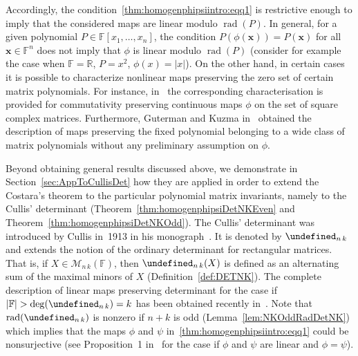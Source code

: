 \documentclass{elsarticle}
\let\det\undefined
\DeclareMathOperator{\det}{det}
\DeclareMathOperator{\rad}{rad}
\def\F{{\mathbb F}}
\def\M{{\mathcal M}}
\theoremstyle{definition}
\numberwithin{equation}{section}
\begin{document}
Accordingly, the condition~\eqref{thm:homogenphipsiintro:eqq1} is restrictive enough to imply that the considered maps are linear modulo $\rad(P)$. In general, for a given polynomial $P \in \F[x_1,\ldots, x_n]$, the condition $P(\phi(\mathbf x)) = P(\mathbf x)$ for all $\mathbf x \in \F^n$ does not imply that $\phi$ is linear modulo $\rad(P)$ (consider for example the case when $\F = \mathbb R$, $P = x^2$, $\phi(x) = |x|$). On the other hand, in certain cases it is possible to characterize nonlinear maps preserving the zero set of certain matrix polynomials. For instance, in~\cite{SEMRL20081051} the corresponding characterisation is provided for commutativity preserving continuous maps $\phi$ on the set of square complex matrices. Furthermore, Guterman and Kuzma in~\cite{Guterman11112009} obtained the description of maps preserving the fixed polynomial belonging to a wide class of matrix polynomials without any preliminary assumption on $\phi$. 


%
%
%

Beyond obtaining general results discussed above, we demonstrate in Section~\ref{sec:AppToCullisDet} how they are applied in order to extend the Costara's theorem to the particular polynomial matrix invariants, namely to the Cullis' determinant (Theorem~\ref{thm:homogenphipsiDetNKEven} and Theorem~\ref{thm:homogenphipsiDetNKOdd}). The Cullis' determinant was introduced by Cullis in~1913 in his monograph~\cite{cullis1913}. It is denoted by $\det_{n\,k}$ and extends the notion of the ordinary determinant for rectangular matrices. That is, if $X \in \M_{n\,k}(\F)$, then $\det_{n\,k}(X)$ is defined as an alternating sum of the maximal minors of $X$ (Definition~\ref{def:DETNK}). The complete description of linear maps preserving determinant for the case if $|\F| > \deg(\det_{n\,k}) = k$ has been obtained recently in~\cite{Guterman2025,Guterman2025b,Guterman2025c}. Note that $\rad(\det_{n\,k})$ is nonzero if $n + k$ is odd (Lemma~\ref{lem:NKOddRadDetNK}) which implies that the maps $\phi$ and $\psi$ in~\eqref{thm:homogenphipsiintro:eqq1} could be nonsurjective (see Proposition~1 in~\cite{Waterhouse1983} for the case if $\phi$ and $\psi$ are linear and $\phi = \psi$).
\end{document}
